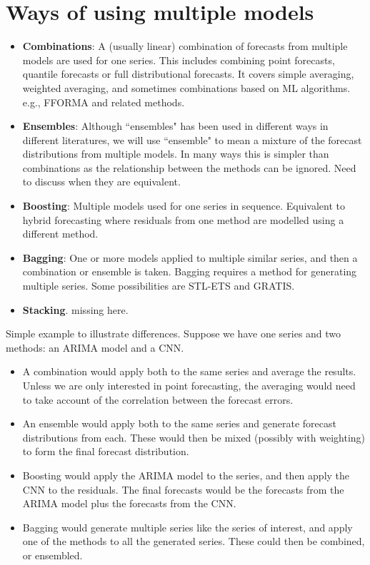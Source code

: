 \documentclass[11pt]{article}
\begin{document}
\section{Ways of using multiple models}
\begin{itemize}
\item \textbf{Combinations}: A (usually linear) combination of forecasts from multiple models are used for one series. This includes combining point forecasts, quantile forecasts or full distributional forecasts. It covers simple averaging, weighted averaging, and sometimes combinations based on ML algorithms. e.g., FFORMA and related methods.
\item \textbf{Ensembles}: Although ``ensembles" has been used in different ways in different literatures, we will use ``ensemble" to mean a mixture of the forecast distributions from multiple models. In many ways this is simpler than combinations as the relationship between the methods can be ignored. Need to discuss when they are equivalent.
\item \textbf{Boosting}: Multiple models used for one series in sequence. Equivalent to hybrid forecasting where residuals from one method are modelled using a different method.
\item \textbf{Bagging}: One or more models applied to multiple similar series, and then a combination or ensemble is taken. Bagging requires a method for generating multiple series. Some possibilities are STL-ETS and GRATIS.
\item \textbf{Stacking}. {\color{red} missing here.}
\end{itemize}

Simple example to illustrate differences. Suppose we have one series and two methods: an ARIMA model and a CNN.

\begin{itemize}
\item A combination would apply both to the same series and average the results. Unless we are only interested in point forecasting, the averaging would need to take account of the correlation between the forecast errors.
\item An ensemble would apply both to the same series and generate forecast distributions from each. These would then be mixed (possibly with weighting) to form the final forecast distribution.
\item Boosting would apply the ARIMA model to the series, and then apply the CNN to the residuals. The final forecasts would be the forecasts from the ARIMA model plus the forecasts from the CNN.
\item Bagging would generate multiple series like the series of interest, and apply one of the methods to all the generated series. These could then be combined, or ensembled.
\end{itemize}
\end{document}
